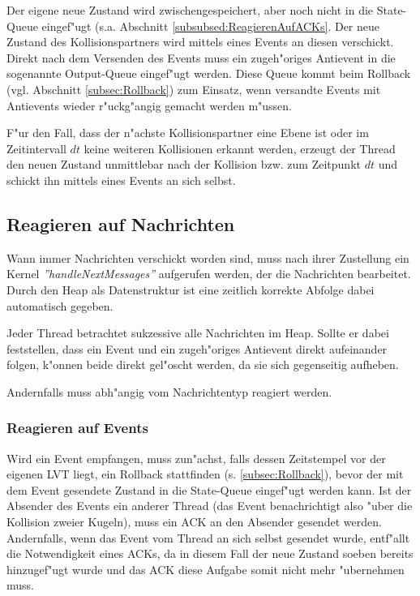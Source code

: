 \documentclass[a4paper, 10pt, openright, parskip, chapterprefix]{scrreprt}
\begin{document}
Der eigene neue Zustand wird zwischengespeichert, aber noch nicht in die State-Queue eingef"ugt (s.a. Abschnitt
\ref{subsubsed:ReagierenAufACKs}. Der neue
Zustand des Kollisionspartners wird mittels eines Events an diesen verschickt. Direkt nach dem Versenden des Events muss
ein zugeh"origes Antievent in die sogenannte Output-Queue eingef"ugt werden. Diese Queue kommt beim Rollback (vgl.
Abschnitt \ref{subsec:Rollback}) zum Einsatz, wenn versandte Events mit Antievents wieder r"uckg"angig gemacht werden
m"ussen.

F"ur den Fall, dass der n"achste Kollisionspartner eine Ebene ist oder im Zeitintervall $dt$ keine weiteren Kollisionen
erkannt werden, erzeugt der Thread den neuen Zustand unmittlebar nach der Kollision bzw. zum Zeitpunkt $dt$ und schickt
ihn mittels eines Events an sich selbst.

\subsection{Reagieren auf Nachrichten}
Wann immer Nachrichten verschickt worden sind, muss nach ihrer Zustellung ein Kernel \emph{''handleNextMessages''} aufgerufen werden, der die
Nachrichten bearbeitet. Durch den Heap als Datenstruktur ist eine zeitlich korrekte Abfolge dabei automatisch gegeben.

Jeder Thread betrachtet sukzessive alle Nachrichten im Heap. Sollte er dabei feststellen, dass ein Event und ein
zugeh"origes Antievent direkt aufeinander folgen, k"onnen beide direkt gel"oscht werden, da sie sich gegenseitig
aufheben.

Andernfalls muss abh"angig vom Nachrichtentyp reagiert werden.

\subsubsection{Reagieren auf Events}
Wird ein Event empfangen, muss zun"achst, falls dessen Zeitstempel vor der eigenen LVT liegt, 
ein Rollback stattfinden (s. \ref{subsec:Rollback}), bevor der mit dem Event gesendete
Zustand in die State-Queue eingef"ugt werden kann. Ist der Absender des Events ein anderer Thread (das Event
benachrichtigt also "uber die Kollision zweier Kugeln), muss ein ACK an den Absender gesendet werden. Andernfalls, wenn
das Event vom Thread an sich selbst gesendet wurde, entf"allt die Notwendigkeit eines ACKs, da in diesem Fall der neue Zustand soeben
bereits hinzugef"ugt wurde und das ACK diese Aufgabe somit nicht mehr "ubernehmen muss.
\end{document}
